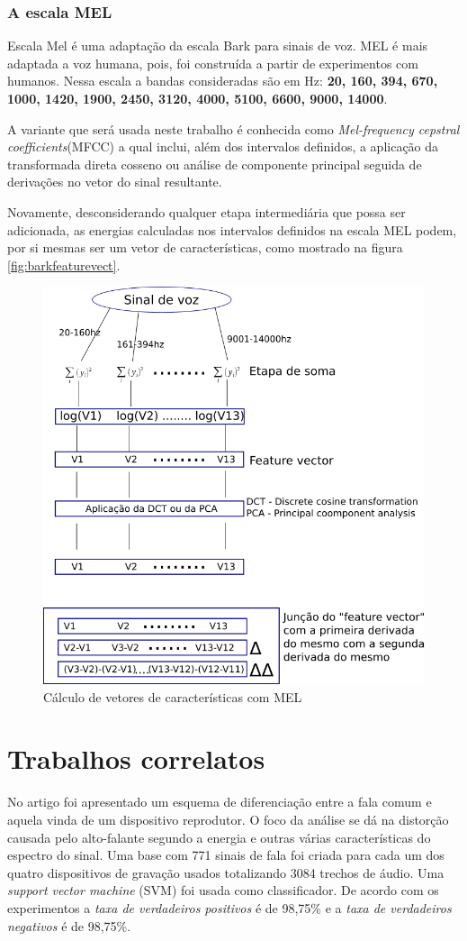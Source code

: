 \begin{myenv}{1.5}
		\subsubsection{A escala MEL}
			\par Escala Mel é uma adaptação da escala Bark para sinais de voz. MEL é mais adaptada a voz humana, pois, foi construída a partir de experimentos com humanos. Nessa escala a bandas consideradas são em Hz: \textbf{20, 160, 394, 670, 1000, 1420, 1900, 2450, 3120, 4000, 5100, 6600, 9000, 14000}.
			\par A variante que será usada neste trabalho é conhecida como \textit{Mel-frequency cepstral coefficients}(MFCC) a qual inclui, além dos intervalos definidos, a aplicação da transformada direta cosseno ou  análise de componente principal seguida de derivações no vetor do sinal resultante.
			\par Novamente, desconsiderando qualquer etapa intermediária que possa ser adicionada, as energias calculadas nos intervalos definidos na escala MEL podem, por si mesmas ser um vetor de características, como mostrado na figura \ref{fig:barkfeaturevect}.
			\begin{figure}[h]
				\centering
				\includegraphics[width=0.7\linewidth]{images/melFeatureVect}
				\caption{Cálculo de vetores de características com MEL}
				\label{fig:melfeaturevect}
			\end{figure}
				
	\section{Trabalhos correlatos}
		\par No artigo \cite{Ren2019} foi apresentado um esquema de diferenciação entre a fala comum e aquela vinda de um dispositivo reprodutor. O foco da análise se dá na distorção causada pelo alto-falante segundo a energia e outras várias características do espectro do sinal. Uma base com 771 sinais de fala foi criada para cada um dos quatro dispositivos de gravação usados totalizando 3084 trechos de áudio. Uma \textit{support vector machine} (SVM) foi usada como classificador. De  acordo com os experimentos a \textit{taxa de verdadeiros positivos} é de 98,75\% e a \textit{taxa de verdadeiros negativos} é de 98,75\%.
		

\end{myenv}

